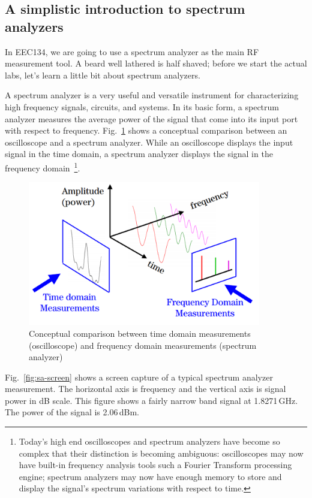\documentclass[letterpaper, 11pt]{article}
\begin{document}
\subsection{A simplistic introduction to spectrum analyzers}
In EEC134, we are going to use a spectrum analyzer as the main RF measurement tool. A beard well lathered is half shaved; before we start the actual labs, let's learn a little bit about spectrum analyzers.

A spectrum analyzer is a very useful and versatile instrument for characterizing high frequency signals, circuits, and systems. In its basic form, a spectrum analyzer measures the average power of the signal that come into its input port with respect to frequency. Fig.~\ref{fig:amp-time-frequency} shows a conceptual comparison between an oscilloscope and a spectrum analyzer. While an oscilloscope displays the input signal in the time domain, a spectrum analyzer displays the signal in the frequency domain~\footnote{Today’s high end oscilloscopes and spectrum analyzers have become so complex that their distinction is becoming ambiguous: oscilloscopes may now have built-in frequency analysis tools such a Fourier Transform processing engine; spectrum analyzers may now have enough memory to store and display the signal’s spectrum variations with respect to time.}. 

\begin{figure}[h]
	\centering
	\includegraphics[width=4in]{amp-time-frequency}
	\caption{Conceptual comparison between time domain measurements (oscilloscope) and frequency domain measurements (spectrum analyzer)~\cite{thomas-sa}}
	\label{fig:amp-time-frequency}
\end{figure}

Fig.~\ref{fig:sa-screen} shows a screen capture of a typical spectrum analyzer measurement. The horizontal axis is frequency and the vertical axis is signal power in dB scale. This figure shows a fairly narrow band signal at 1.8271\,GHz. The power of the signal is 2.06\,dBm.
\end{document}
